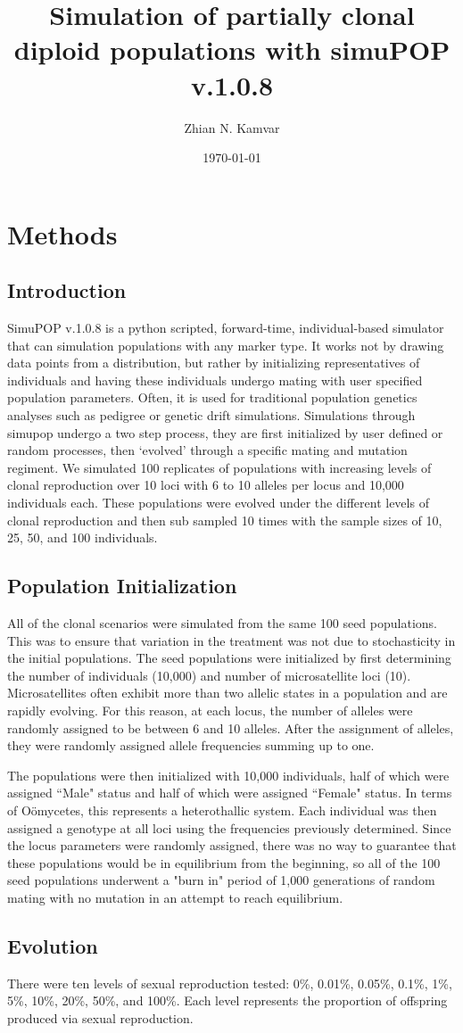 \documentclass[letterpaper, draft, 10pt]{article}
\title{Simulation of partially clonal diploid populations with simuPOP v.1.0.8}
\author{Zhian N. Kamvar}
\date{\today}
\begin{document}
\maketitle
\linenumbers

\section{Methods}
\subsection*{Introduction}

SimuPOP v.1.0.8 is a python scripted, forward-time, individual-based simulator that can simulation populations with any marker type. 
It works not by drawing data points from a distribution, but rather by initializing representatives of individuals and having these individuals undergo mating with user specified population parameters.
Often, it is used for traditional population genetics analyses such as pedigree or genetic drift simulations.
Simulations through simupop undergo a two step process, they are first initialized by user defined or random processes, then `evolved' through a specific mating and mutation regiment.
We simulated 100 replicates of populations with increasing levels of clonal reproduction over 10 loci with 6 to 10 alleles per locus and 10,000 individuals each. 
These populations were evolved under the different levels of clonal reproduction and then sub sampled 10 times with the sample sizes of 10, 25, 50, and 100 individuals. 

\subsection*{Population Initialization}
All of the clonal scenarios were simulated from the same 100 seed populations. 
This was to ensure that variation in the treatment was not due to stochasticity in the initial populations.
The seed populations were initialized by first determining the number of individuals (10,000) and number of microsatellite loci (10). 
Microsatellites often exhibit more than two allelic states in a population and are rapidly evolving.
For this reason, at each locus, the number of alleles were randomly assigned to be between 6 and 10 alleles.
After the assignment of alleles, they were randomly assigned allele frequencies summing up to one. 

The populations were then initialized with 10,000 individuals, half of which were assigned ``Male" status and half of which were assigned ``Female" status. 
In terms of O\"omycetes, this represents a heterothallic system. 
Each individual was then assigned a genotype at all loci using the frequencies previously determined.
Since the locus parameters were randomly assigned, there was no way to guarantee that these populations would be in equilibrium from the beginning, so all of the 100 seed populations underwent a "burn in" period of 1,000 generations of random mating with no mutation in an attempt to reach equilibrium.

\subsection*{Evolution}
There were ten levels of sexual reproduction tested: 0\%, 0.01\%, 0.05\%, 0.1\%, 1\%, 5\%, 10\%, 20\%, 50\%, and 100\%. Each level represents the proportion of offspring produced via sexual reproduction. 
\end{document}
